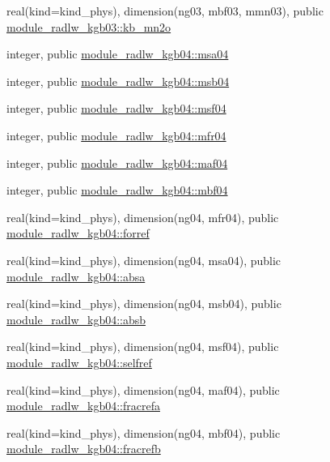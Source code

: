 \begin{DoxyCompactItemize}
\item 
real(kind=kind\+\_\+phys), dimension(ng03, mbf03, mmn03), public \hyperlink{group__module__radlw__main_gaa2442e663e83b222648a86a34cd6631c}{module\+\_\+radlw\+\_\+kgb03\+::kb\+\_\+mn2o}
\item 
integer, public \hyperlink{namespacemodule__radlw__kgb04_ac8c5caff005fd04d01009dd9e977d570}{module\+\_\+radlw\+\_\+kgb04\+::msa04}
\item 
integer, public \hyperlink{group__module__radlw__main_gab9ce0111a156f7b80f2adaa9f3e84a32}{module\+\_\+radlw\+\_\+kgb04\+::msb04}
\item 
integer, public \hyperlink{group__module__radlw__main_ga4b38dd1165aca80e19697df7ae74a27a}{module\+\_\+radlw\+\_\+kgb04\+::msf04}
\item 
integer, public \hyperlink{group__module__radlw__main_gab6ae25b4a793bf78ccd504685d639039}{module\+\_\+radlw\+\_\+kgb04\+::mfr04}
\item 
integer, public \hyperlink{group__module__radlw__main_ga60ff35def4e526c7d9cf3ec88bdd4485}{module\+\_\+radlw\+\_\+kgb04\+::maf04}
\item 
integer, public \hyperlink{group__module__radlw__main_ga768f4447809fb11206dce383a121d595}{module\+\_\+radlw\+\_\+kgb04\+::mbf04}
\item 
real(kind=kind\+\_\+phys), dimension(ng04, mfr04), public \hyperlink{group__module__radlw__main_ga816fd065291a92c13d026d38a708479b}{module\+\_\+radlw\+\_\+kgb04\+::forref}
\item 
real(kind=kind\+\_\+phys), dimension(ng04, msa04), public \hyperlink{group__module__radlw__main_ga8d73bb6971c872e15a24a81d3917167e}{module\+\_\+radlw\+\_\+kgb04\+::absa}
\item 
real(kind=kind\+\_\+phys), dimension(ng04, msb04), public \hyperlink{group__module__radlw__main_gaaacc55911b42c67396b5cdc4318e0d5f}{module\+\_\+radlw\+\_\+kgb04\+::absb}
\item 
real(kind=kind\+\_\+phys), dimension(ng04, msf04), public \hyperlink{group__module__radlw__main_ga696b91ef86ccbda17df10f770797cafa}{module\+\_\+radlw\+\_\+kgb04\+::selfref}
\item 
real(kind=kind\+\_\+phys), dimension(ng04, maf04), public \hyperlink{group__module__radlw__main_gace1d87742e2c543d9b0662e1c7d2b624}{module\+\_\+radlw\+\_\+kgb04\+::fracrefa}
\item 
real(kind=kind\+\_\+phys), dimension(ng04, mbf04), public \hyperlink{group__module__radlw__main_gae8d5d56d09dfbe06d918c6b098e3fddf}{module\+\_\+radlw\+\_\+kgb04\+::fracrefb}

\end{DoxyCompactItemize}
